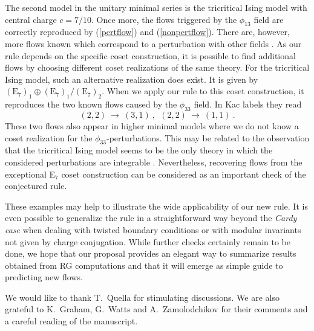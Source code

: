 \documentclass[a4paper,prd,twocolumn,nobibnotes,amssymb,preprintnumbers]{revtex4}
\begin{document}
The second model in the unitary minimal series is the tricritical Ising
model with central charge $c=7/10$. Once more, the flows triggered by 
the $\phi_{13}$ field \cite{Chim:1996kf} are correctly reproduced by 
(\ref{pertflow}) and (\ref{nonpertflow}). There are, however, more 
flows known which correspond to a perturbation with other fields 
\cite{Affleck:2000jv}. As our rule depends on the specific coset 
construction, it is possible to find additional flows by choosing  
different coset realizations of the same theory. For the tricritical 
Ising model, such an alternative realization does exist. It is 
given by $(\text{E}_{7})_{1}\oplus(\text{E}_{7})_{1}/(\text{E}_{7})_{2} $. 
When we apply our rule to this coset construction, it reproduces the two
known flows caused by the $\phi_{33}$ field. In Kac labels they read 
\[
(2,2)\ \longrightarrow\ (3,1)\ ,\ \ (2,2)\ \longrightarrow\ (1,1)\ .
\]
These two flows also appear in higher minimal models \cite{Graham:2001tg} 
where we do not know a coset realization for the
$\phi_{33}$-perturbations. 
This may be related to the observation that the tricritical Ising model 
seems to be the only theory in which the considered perturbations are 
integrable \cite{Graham:2001tg}. Nevertheless, recovering flows from
the exceptional E$_{7}$ coset construction can be considered as an
important check of the conjectured rule.
\medskip 

These examples may help to illustrate the wide applicability 
of our new rule. It is even possible to generalize the rule in a
straightforward way beyond the {\em Cardy case} when dealing with twisted
boundary conditions or with modular invariants not given by charge
conjugation. While further checks certainly remain to be 
done, we hope that our proposal provides an elegant way to 
summarize results obtained from RG computations and that it 
will emerge as simple guide to predicting new flows.  
\smallskip  

\noindent
\begin{acknowledgments} 
We would like to thank T.\ Quella for stimulating discussions. We are
also grateful to 
K.\ Graham, G.\ Watts and A.\ Zamolodchikov for their comments and a 
careful reading of the manuscript. 
\end{acknowledgments}
\end{document}
